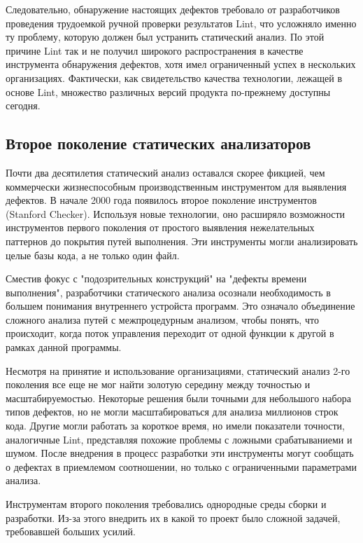 Следовательно, обнаружение настоящих дефектов требовало от разработчиков проведения трудоемкой 
ручной проверки результатов Lint, что усложняло именно ту проблему, которую должен был 
устранить статический анализ. По этой причине Lint так и не получил широкого распространения в 
качестве инструмента обнаружения дефектов, хотя имел ограниченный успех в нескольких 
организациях. Фактически, как свидетельство качества технологии, лежащей в основе Lint, 
множество различных версий продукта по-прежнему доступны сегодня. %

\subsection{Второе поколение статических анализаторов}
Почти два десятилетия статический анализ оставался скорее фикцией, чем коммерчески 
жизнеспособным производственным инструментом для выявления дефектов. В начале 2000 года
появилось второе поколение инструментов (Stanford Checker). Используя новые 
технологии, оно расширяло возможности инструментов первого поколения от простого выявления 
нежелательных паттернов до покрытия путей выполнения. Эти инструменты могли анализировать 
целые базы кода, а не только один файл. 

Сместив фокус с "подозрительных конструкций" на "дефекты времени выполнения", разработчики 
статического анализа осознали необходимость в большем понимания внутреннего 
устройста программ. Это означало объединение сложного анализа путей с межпроцедурным анализом, 
чтобы понять, что происходит, когда поток управления переходит от одной функции к другой в 
рамках данной программы.

Несмотря на принятие и использование организациями, статический анализ 2-го поколения все еще 
не мог найти золотую середину между точностью и масштабируемостью. Некоторые решения были 
точными для небольшого набора типов дефектов, но не могли масштабироваться для анализа 
миллионов строк кода. Другие могли работать за короткое время, но имели показатели точности, 
аналогичные Lint, представляя похожие проблемы с ложными срабатываниеми и шумом. После 
внедрения в процесс разработки эти инструменты могут сообщать о дефектах в приемлемом 
соотношении, но только с ограниченными параметрами анализа. 

Инструментам второго поколения требовались однородные среды сборки и разработки. 
Из-за этого внедрить их в какой то проект было сложной задачей, требовавшей больших усилий.

